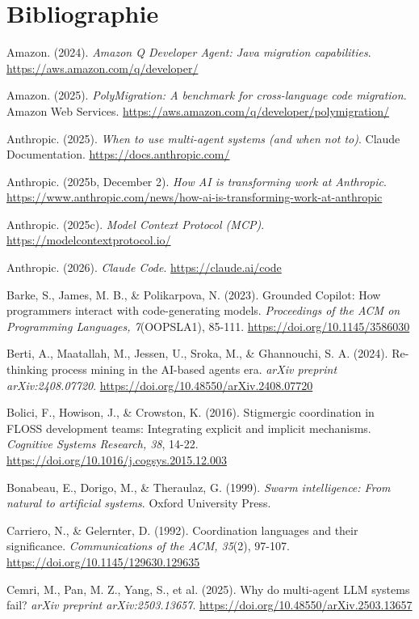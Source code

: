 \documentclass[12pt,a4paper]{article}
\begin{document}
\section{Bibliographie}\label{bibliographie}

Amazon. (2024). \emph{Amazon Q Developer Agent: Java migration
capabilities}. \url{https://aws.amazon.com/q/developer/}

Amazon. (2025). \emph{PolyMigration: A benchmark for cross-language code
migration}. Amazon Web Services.
\url{https://aws.amazon.com/q/developer/polymigration/}

Anthropic. (2025). \emph{When to use multi-agent systems (and when not
to)}. Claude Documentation. \url{https://docs.anthropic.com/}

Anthropic. (2025b, December 2). \emph{How AI is transforming work at
Anthropic}.
\url{https://www.anthropic.com/news/how-ai-is-transforming-work-at-anthropic}

Anthropic. (2025c). \emph{Model Context Protocol (MCP)}.
\url{https://modelcontextprotocol.io/}

Anthropic. (2026). \emph{Claude Code}. \url{https://claude.ai/code}

Barke, S., James, M. B., \& Polikarpova, N. (2023). Grounded Copilot:
How programmers interact with code-generating models. \emph{Proceedings
of the ACM on Programming Languages, 7}(OOPSLA1), 85-111.
\url{https://doi.org/10.1145/3586030}

Berti, A., Maatallah, M., Jessen, U., Sroka, M., \& Ghannouchi, S. A.
(2024). Re-thinking process mining in the AI-based agents era.
\emph{arXiv preprint arXiv:2408.07720}.
\url{https://doi.org/10.48550/arXiv.2408.07720}

Bolici, F., Howison, J., \& Crowston, K. (2016). Stigmergic coordination
in FLOSS development teams: Integrating explicit and implicit
mechanisms. \emph{Cognitive Systems Research, 38}, 14-22.
\url{https://doi.org/10.1016/j.cogsys.2015.12.003}

Bonabeau, E., Dorigo, M., \& Theraulaz, G. (1999). \emph{Swarm
intelligence: From natural to artificial systems}. Oxford University
Press.

Carriero, N., \& Gelernter, D. (1992). Coordination languages and their
significance. \emph{Communications of the ACM, 35}(2), 97-107.
\url{https://doi.org/10.1145/129630.129635}

Cemri, M., Pan, M. Z., Yang, S., et al. (2025). Why do multi-agent LLM
systems fail? \emph{arXiv preprint arXiv:2503.13657}.
\url{https://doi.org/10.48550/arXiv.2503.13657}
\end{document}
